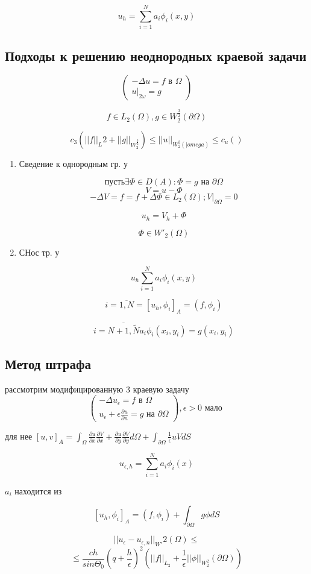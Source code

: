 \documentclass[12pt, a4paper]{article}
\begin{document}
\[ u_h = \sum_{i=1}^{N} a_i \phi_i (x, y) \]

\subsection{Подходы к решению неоднородных краевой задачи}

\[
\left(
    \begin{array}{c}
        - \Delta u = f \textrm{ в } \Omega \\
        u|_{2\omega} = g
    \end{array}
\right)
\]

\[ f \in L_2 (\Omega) , g \in W^{\frac{3}{2}}_2 (\partial \Omega) \]

\[ c_3 ({||f||}_L2 + {||g||}_{W_2^{\frac{3}{2}}}) \leq {||u||}_{W^2_2(|omega)} \leq c_u() \]

\begin{enumerate}
    \item Сведение к однородным гр. у

    \[ пусть  \exists \Phi \in  D(A): \Phi=g  \textrm{ на } \partial \Omega \]
    \[ V = u - \Phi \]
    \[ - \Delta V = f = f + \Delta \Phi \in L_2 (\Omega); V |_{\partial \Omega} = 0 \]

    \[ u_h = V_h + \Phi \]

    \[ \Phi \in {W'}_2 (\Omega) \]

    \item СНос тр. у

    \[ u_h \sum_{i=1}^{N} a_i \phi_i (x, y) \]

    \[ i = \overline{1, N} = [u_h, \phi_i]_A = (f, \phi_i) \]

    \[ i = \overline{N + 1, \widetilde{N}} a_i \phi_i (x_i, y_i) = g(x_i, y_i) \]

\end{enumerate}

\subsection{Метод штрафа}

рассмотрим модифицированную 3 краевую задачу
\[
\left(
    \begin{array}{c}
        - \Delta u_{\epsilon} = f \textrm{ в  } \Omega \\
        u_{\epsilon} + \epsilon \frac{\partial u}{\partial n} = g \textrm{ на  } \partial \Omega
    \end{array}
\right), \epsilon > 0 \textrm{ мало }
\]

для нее $ [u, v]_A = \int_{\Omega}^{} \frac{\partial u}{\partial x} \frac{\partial V}{\partial x} + \frac{\partial u}{\partial y} \frac{\partial V}{\partial y} d\Omega + \int_{\partial \Omega}^{} \frac{1}{\epsilon} u V dS $

\[ u_{\epsilon, h} = \sum_{i=1}^{N} a_i \phi_i(x) \]

$ a_i $ находится из

\[ [u_h, \phi_i]_A = (f, \phi_i) + \int_{\partial \Omega}^{}g \phi dS \]

\[ ||u_\epsilon - u_{\epsilon, n} ||_{W'} 2 (\Omega) \leq \]
\[ \leq \frac{ch}{sin \Theta_0} {(q + \frac{h}{\epsilon})}^2 ({||f||}_{L_2} + \frac{1 }{\epsilon} ||\phi||_{W_2^2} (\partial \Omega )) \]
\end{document}

